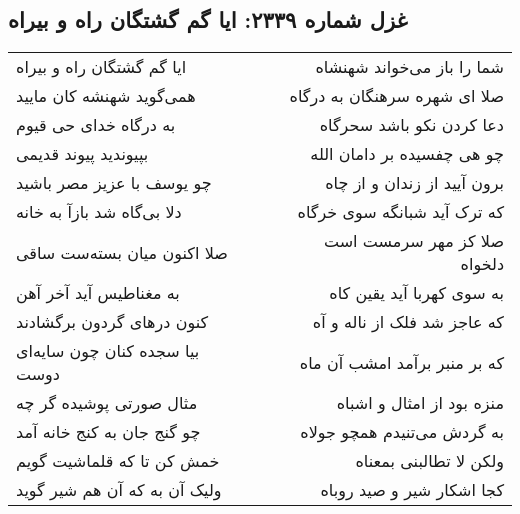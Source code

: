 \begin{center}
\section*{غزل شماره ۲۳۳۹: ایا گم گشتگان راه و بیراه}
\label{sec:2339}
\begin{longtable}{l p{0.5cm} r}
ایا گم گشتگان راه و بیراه
&&
شما را باز می‌خواند شهنشاه
\\
همی‌گوید شهنشه کان مایید
&&
صلا ای شهره سرهنگان به درگاه
\\
به درگاه خدای حی قیوم
&&
دعا کردن نکو باشد سحرگاه
\\
بپیوندید پیوند قدیمی
&&
چو هی چفسیده بر دامان الله
\\
چو یوسف با عزیز مصر باشید
&&
برون آیید از زندان و از چاه
\\
دلا بی‌گاه شد بازآ به خانه
&&
که ترک آید شبانگه سوی خرگاه
\\
صلا اکنون میان بسته‌ست ساقی
&&
صلا کز مهر سرمست است دلخواه
\\
به مغناطیس آید آخر آهن
&&
به سوی کهربا آید یقین کاه
\\
کنون درهای گردون برگشادند
&&
که عاجز شد فلک از ناله و آه
\\
بیا سجده کنان چون سایه‌ای دوست
&&
که بر منبر برآمد امشب آن ماه
\\
مثال صورتی پوشیده گر چه
&&
منزه بود از امثال و اشباه
\\
چو گنج جان به کنج خانه آمد
&&
به گردش می‌تنیدم همچو جولاه
\\
خمش کن تا که قلماشیت گویم
&&
ولکن لا تطالبنی بمعناه
\\
ولیک آن به که آن هم شیر گوید
&&
کجا اشکار شیر و صید روباه
\\
\end{longtable}
\end{center}
